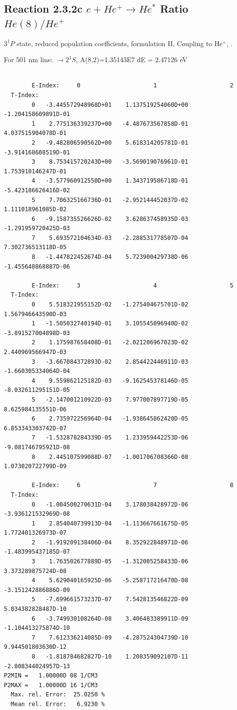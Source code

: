 \documentclass[12pt,dvipdfmx]{article}
\begin{document}
\subsection{
  Reaction 2.3.2c $e + He^+ \rightarrow He^*  $ Ratio $He(8)/He^+$
}

  $3^1P$ state,
  reduced population coefficients, formulation II,
  Coupling to He$^+$, \cite{kn:Fujimoto}.

  For 501 nm line: $\rightarrow 2^1S$, A(8,2)=1.35143E7 dE = 2.47126 eV

\begin{small}\begin{verbatim}

        E-Index:     0                     1                     2
  T-Index:
        0   -3.445572948968D+01    1.137519254060D+00   -1.204158609891D-01
        1    2.775136339237D+00   -4.487673567858D-01    4.037515904078D-01
        2   -9.482806590562D+00    5.618314205781D-01   -3.914168608519D-01
        3    8.753415720243D+00   -3.569019076961D-01    1.753910146247D-01
        4   -3.577960912550D+00    1.343719586718D-01   -5.423186626416D-02
        5    7.706325166736D-01   -2.952144452037D-02    1.111018961085D-02
        6   -9.158735526626D-02    3.628637458935D-03   -1.291959720425D-03
        7    5.693572104634D-03   -2.288531778507D-04    7.302736513118D-05
        8   -1.447822452674D-04    5.723900429738D-06   -1.455648868887D-06

        E-Index:     3                     4                     5
  T-Index:
        0    5.518321955152D-02   -1.275404675701D-02    1.567946643590D-03
        1   -1.505032740194D-01    3.105545096940D-02   -3.891527004898D-03
        2    1.175987658408D-01   -2.021206967023D-02    2.440969566947D-03
        3   -3.667084372893D-02    2.854422446911D-03   -1.660305334064D-04
        4    9.559862125182D-03   -9.162545378146D-05   -8.032611295151D-05
        5   -2.147001210922D-03    7.977007897719D-05    8.625984135551D-06
        6    2.735972256964D-04   -1.938645862420D-05    6.853343303742D-07
        7   -1.532878284339D-05    1.233959442253D-06   -9.081746795921D-08
        8    2.445107599088D-07   -1.001706708366D-08    1.073020722799D-09

        E-Index:     6                     7                     8
  T-Index:
        0   -1.004500270631D-04    3.178038428972D-06   -3.936121532969D-08
        1    2.854040739913D-04   -1.113667661675D-05    1.772401326973D-07
        2   -1.919209138406D-04    8.352922848971D-06   -1.483995437185D-07
        3    1.763502677889D-05   -1.312005258433D-06    3.373289875724D-08
        4    5.629040165925D-06   -5.258717216470D-08   -3.151242886886D-09
        5   -7.699661573237D-07    7.542813546822D-09    5.034382828487D-10
        6   -3.749930108264D-08    3.406483389911D-09   -1.104413275874D-10
        7    7.612336214085D-09   -4.287524304739D-10    9.944501803630D-12
        8   -1.818784682827D-10    1.208359092107D-11   -2.808344024957D-13
P2MIN =   1.00000D 08 1/CM3
P2MAX =   1.00000D 16 1/CM3
  Max. rel. Error:  25.0250 %
  Mean rel. Error:   6.9230 %


\end{verbatim}\end{small}
\end{document}
